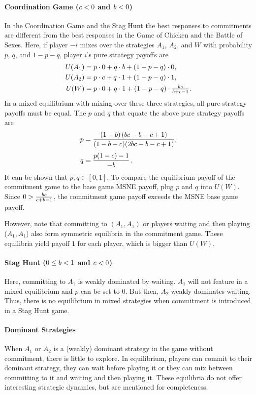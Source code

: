 \documentclass[../paper.tex]{subfiles}
\begin{document}
\paragraph{Coordination Game ($c<0$ and $b<0$)}
In the Coordination Game and the Stag Hunt the best responses to commitments are different from the best responses in the Game of Chicken and the Battle of Sexes. Here, if player $-i$ mixes over the strategies $A_1$, $A_2$, and $W$ with probability $p$, $q$, and $1-p-q$, player $i$'s pure strategy payoffs are
\begin{align*}
U(A_1) &= p\cdot 0 + q\cdot b + (1-p-q)\cdot 0,\\[0mm]
U(A_2) &= p\cdot c + q\cdot 1 + (1-p-q)\cdot 1,\\[0mm]
U(W) &= p\cdot 0 + q\cdot 1 + (1-p-q)\cdot \tfrac{bc}{b+c-1}.
\end{align*}
In a mixed equilibrium with mixing over these three strategies, all pure strategy payoffs must be equal. The $p$ and $q$ that equate the above pure strategy payoffs are
\begin{alignat*}{1}
p &= \frac{(1-b)\,(bc-b-c+1)}{(1-b-c)(2bc-b - c + 1)},\\[1mm]
q &= \frac{p(1-c)-1}{-b}\,.
\end{alignat*}
It can be shown that $p,q\in[0,1]$. To compare the equilibrium payoff of the commitment game to the base game MSNE payoff, plug $p$ and $q$ into $U(W)$. Since $0>\tfrac{bc}{c+b-1}$, the commitment game payoff exceeds the MSNE base game payoff.
 
However, note that committing to $(A_1,A_1)$ or players waiting and then playing ($A_1,A_1$) also form symmetric equilibria in the commitment game. These equilibria yield payoff $1$ for each player, which is bigger than $U(W)$.
\paragraph{Stag Hunt ($0\leq b<1$ and $c<0$)}
Here, committing to $A_1$ is weakly dominated by waiting. $A_1$ will not feature in a mixed equilibrium and $p$ can be set to $0$. But then, $A_2$ weakly dominates waiting. Thus, there is no equilibrium in mixed strategies when commitment is introduced in a Stag Hunt game.
\paragraph{Dominant Strategies}
When $A_1$ or $A_2$ is a (weakly) dominant strategy in the game without commitment, there is little to explore. In equilibrium, players can commit to their dominant strategy, they can wait before playing it or they can mix between committing to it and waiting and then playing it. These equilibria do not offer interesting strategic dynamics, but are mentioned for completeness.
\end{document}

